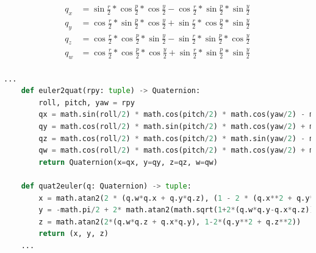 \begin{myequation}[h!]
  \begin{equation}
  \begin{aligned}
  q_x &= \sin{\frac{r}{2}} * \cos{\frac{p}{2}} * \cos{\frac{y}{2}} - \cos{\frac{r}{2}} * \sin{\frac{p}{2}} * \sin{\frac{y}{2}}  \\
  q_y &= \cos{\frac{r}{2}} * \sin{\frac{p}{2}} * \cos{\frac{y}{2}} + \sin{\frac{r}{2}} * \cos{\frac{p}{2}} * \sin{\frac{y}{2}}  \\
  q_z &= \cos{\frac{r}{2}} * \cos{\frac{p}{2}} * \sin{\frac{y}{2}} - \sin{\frac{r}{2}} * \sin{\frac{p}{2}} * \cos{\frac{y}{2}}  \\
  q_w &= \cos{\frac{r}{2}} * \cos{\frac{p}{2}} * \cos{\frac{y}{2}} + \sin{\frac{r}{2}} * \sin{\frac{p}{2}} * \sin{\frac{y}{2}}  \\
  \end{aligned}
  \label{ec:quat_to_euler}
  \end{equation}
  \caption[Obtención de cuaterniones a partir de ángulos de Euler (RPY)]{Obtención de cuaterniones a partir de ángulos de Euler (RPY)}
\end{myequation}

\begin{code}[h!]
  \begin{lstlisting}[language=Python]
    ...
    def euler2quat(rpy: tuple) -> Quaternion:
        roll, pitch, yaw = rpy
        qx = math.sin(roll/2) * math.cos(pitch/2) * math.cos(yaw/2) - math.cos(roll/2) * math.sin(pitch/2) * math.sin(yaw/2)
        qy = math.cos(roll/2) * math.sin(pitch/2) * math.cos(yaw/2) + math.sin(roll/2) * math.cos(pitch/2) * math.sin(yaw/2)
        qz = math.cos(roll/2) * math.cos(pitch/2) * math.sin(yaw/2) - math.sin(roll/2) * math.sin(pitch/2) * math.cos(yaw/2)
        qw = math.cos(roll/2) * math.cos(pitch/2) * math.cos(yaw/2) + math.sin(roll/2) * math.sin(pitch/2) * math.sin(yaw/2)
        return Quaternion(x=qx, y=qy, z=qz, w=qw)

    def quat2euler(q: Quaternion) -> tuple:
        x = math.atan2(2 * (q.w*q.x + q.y*q.z), (1 - 2 * (q.x**2 + q.y**2)))
        y = -math.pi/2 + 2* math.atan2(math.sqrt(1+2*(q.w*q.y-q.x*q.z)), math.sqrt(1-2*(q.w*q.y-q.x*q.z)))
        z = math.atan2(2*(q.w*q.z + q.x*q.y), 1-2*(q.y**2 + q.z**2))
        return (x, y, z)
    ...
  \end{lstlisting}
\caption[Funciones matemáticas del módulo \texttt{geom\_utils.py}]{Funciones matemáticas del módulo \texttt{geom\_utils.py}}
\label{cod:geom_utils}
\end{code}


